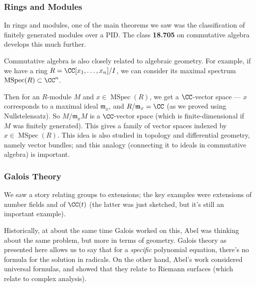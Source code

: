 \subsubsection{Rings and Modules}

In rings and modules, one of the main theorems we saw was the classification of finitely generated modules over a PID. The class \textbf{18.705} on commutative algebra develops this much further. 

Commutative algebra is also closely related to algebraic geometry. For example, if we have a ring $R = \CC[x_1, \ldots, x_n]/I$, we can consider its maximal spectrum $\operatorname{MSpec}(R) \subset \CC^n$. 

Then for an $R$-module $M$ and $x \in \operatorname{MSpec}(R)$, we get a $\CC$-vector space --- $x$ corresponds to a maximal ideal $\mathfrak{m}_x$, and $R/\mathfrak{m}_x = \CC$ (as we proved using Nullstelensatz). So $M/\mathfrak{m}_xM$ is a $\CC$-vector space (which is finite-dimensional if $M$ was finitely generated). This gives a family of vector spaces indexed by $x \in \operatorname{MSpec}(R)$. This idea is also studied in topology and differential geometry, namely vector bundles; and this analogy (connecting it to ideals in commutative algebra) is important. 

\subsubsection{Galois Theory}

We saw a story relating groups to extensions; the key examples were extensions of number fields and of $\CC(t)$ (the latter was just sketched, but it's still an important example). 

Historically, at about the same time Galois worked on this, Abel was thinking about the same problem, but more in terms of geometry. Galois theory as presented here allows us to say that for a \emph{specific} polynomial equation, there's no formula for the solution in radicals. On the other hand, Abel's work considered universal formulas, and showed that they relate to Riemann surfaces (which relate to complex analysis). 



\rhead{\rightmark}

